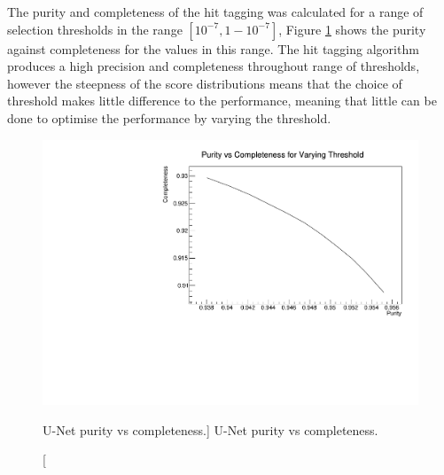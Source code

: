 The purity and completeness of the hit tagging was calculated for a range of 
selection thresholds in the range $[10^{-7}, 1 - 10^{-7}]$, Figure 
\ref{fig:unet_pur_comp} shows the purity against completeness for the values 
in this range. The hit tagging algorithm produces a high precision and 
completeness throughout range of thresholds, however the steepness of the 
score distributions means that the choice of threshold makes little difference 
to the performance, meaning that little can be done to optimise the performance
by varying the threshold.
\begin{figure}
	\centering
	\includegraphics[width=\textwidth]{figures/unet_pur_v_comp.pdf}
	\caption
	[U-Net purity vs completeness.]
	{U-Net purity vs completeness.}
	\label{fig:unet_pur_comp}
\end{figure}

